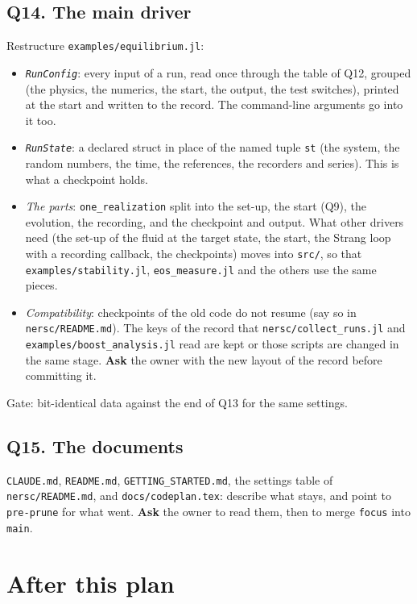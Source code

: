 \documentclass[11pt,aps,preprint,nofootinbib,superscriptaddress,tightenlines]{revtex4-2}
\newcommand{\ask}{\textbf{Ask}}
\begin{document}
\subsection*{Q14. The main driver}
Restructure \nolinkurl{examples/equilibrium.jl}:
\begin{itemize}
\item \emph{\texttt{RunConfig}}: every input of a run, read once through the table of Q12, grouped (the physics, the numerics, the start, the
  output, the test switches), printed at the start and written to the record.  The command-line arguments go into it too.
\item \emph{\texttt{RunState}}: a declared struct in place of the named tuple \texttt{st} (the system, the random numbers, the time, the
  references, the recorders and series).  This is what a checkpoint holds.
\item \emph{The parts}: \texttt{one\_realization} split into the set-up, the start (Q9), the evolution, the recording, and the checkpoint and
  output.  What other drivers need (the set-up of the fluid at the target state, the start, the Strang loop with a recording callback, the
  checkpoints) moves into \nolinkurl{src/}, so that \nolinkurl{examples/stability.jl}, \nolinkurl{eos_measure.jl} and the others use the same
  pieces.
\item \emph{Compatibility}: checkpoints of the old code do not resume (say so in \nolinkurl{nersc/README.md}).  The keys of the record that
  \nolinkurl{nersc/collect_runs.jl} and \nolinkurl{examples/boost_analysis.jl} read are kept or those scripts are changed in the same stage.
  \ask{} the owner with the new layout of the record before committing it.
\end{itemize}
Gate: bit-identical data against the end of Q13 for the same settings.

\subsection*{Q15. The documents}
\nolinkurl{CLAUDE.md}, \nolinkurl{README.md}, \nolinkurl{GETTING_STARTED.md}, the settings table of \nolinkurl{nersc/README.md}, and
\nolinkurl{docs/codeplan.tex}: describe what stays, and point to \texttt{pre-prune} for what went.  \ask{} the owner to read them, then to merge
\texttt{focus} into \texttt{main}.

\section{After this plan}
\label{sec:after}
\end{document}
